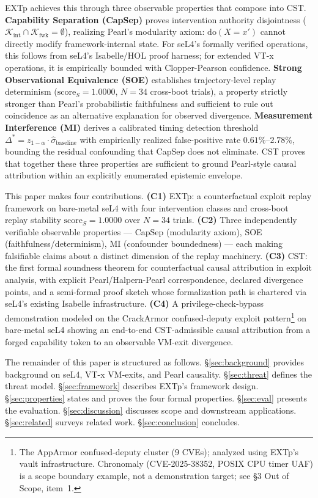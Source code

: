 \documentclass[conference]{IEEEtran}
\newcommand{\Kint}{\mathcal{K}_\text{int}}
\newcommand{\Kfwk}{\mathcal{K}_\text{fwk}}
\newcommand{\sigbase}{\hat{\sigma}_\text{baseline}}
\newcommand{\Dstar}{\Delta^{*}}
\newcommand{\scoreS}{\text{score}_S}
\newcommand{\dox}[1]{\text{do}(X{=}#1)}
\begin{document}
EXTp achieves this through three observable properties that compose
into CST. \textbf{Capability Separation (CapSep)} proves intervention
authority disjointness ($\Kint \cap \Kfwk = \emptyset$), realizing
Pearl's modularity axiom: $\dox{x'}$ cannot directly modify
framework-internal state. For seL4's formally verified operations,
this follows from seL4's Isabelle/HOL proof harness; for extended
VT-x operations, it is empirically bounded with Clopper-Pearson
confidence. \textbf{Strong Observational Equivalence (SOE)}
establishes trajectory-level replay determinism
($\scoreS = 1.0000$, $N{=}34$ cross-boot trials), a property strictly
stronger than Pearl's probabilistic faithfulness and sufficient to
rule out coincidence as an alternative explanation for observed
divergence. \textbf{Measurement Interference (MI)} derives a
calibrated timing detection threshold $\Dstar = z_{1-\alpha} \cdot
\sigbase$ with empirically realized false-positive rate
$0.61\%$--$2.78\%$, bounding the residual confounding that CapSep
does not eliminate. CST proves that together these three properties
are sufficient to ground Pearl-style causal attribution within an
explicitly enumerated epistemic envelope.

This paper makes four contributions.
\textbf{(C1)} EXTp: a counterfactual exploit replay framework on
bare-metal seL4 with four intervention classes and cross-boot replay
stability $\scoreS = 1.0000$ over $N{=}34$ trials.
\textbf{(C2)} Three independently verifiable observable properties
--- CapSep (modularity axiom), SOE (faithfulness/determinism), MI
(confounder boundedness) --- each making falsifiable claims about a
distinct dimension of the replay machinery.
\textbf{(C3)} CST: the first formal soundness theorem for
counterfactual causal attribution in exploit analysis, with explicit
Pearl/Halpern-Pearl correspondence, declared divergence points, and a
semi-formal proof sketch whose formalization path is chartered via
seL4's existing Isabelle infrastructure.
\textbf{(C4)} A privilege-check-bypass demonstration modeled on the
CrackArmor confused-deputy exploit pattern\footnote{The AppArmor
confused-deputy cluster (9 CVEs); analyzed using EXTp's vault
infrastructure. Chronomaly (CVE-2025-38352, POSIX CPU timer UAF) is
a scope boundary example, not a demonstration target; see \S3 Out of
Scope, item~1.} on bare-metal seL4 showing an end-to-end
CST-admissible causal attribution from a forged capability token to
an observable VM-exit divergence.

The remainder of this paper is structured as follows. \S\ref{sec:background}
provides background on seL4, VT-x VM-exits, and Pearl causality.
\S\ref{sec:threat} defines the threat model. \S\ref{sec:framework}
describes EXTp's framework design. \S\ref{sec:properties} states and
proves the four formal properties. \S\ref{sec:eval} presents the
evaluation. \S\ref{sec:discussion} discusses scope and downstream
applications. \S\ref{sec:related} surveys related work.
\S\ref{sec:conclusion} concludes.
\end{document}
